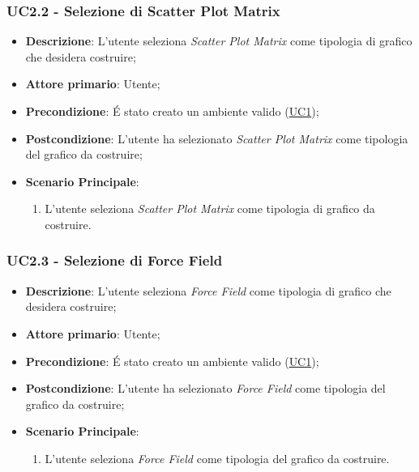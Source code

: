\subsubsection{UC2.2 - Selezione di Scatter Plot Matrix}
\label{ssub:uc2.2}
\begin{itemize}

	\item \textbf{Descrizione}: L’utente seleziona \emph{Scatter Plot Matrix} come tipologia di grafico che desidera 
	costruire;

    \item \textbf{Attore primario}: Utente;

	\item \textbf{Precondizione}:   É stato creato un ambiente valido (\hyperref[sub:uc1]{UC1});

	\item \textbf{Postcondizione}:  L'utente ha selezionato \emph{Scatter Plot Matrix} come tipologia del grafico da 
	costruire;

	\item \textbf{Scenario Principale}:
	\begin{enumerate}
		\item L'utente seleziona \emph{Scatter Plot Matrix} come tipologia di grafico da costruire.
	\end{enumerate}
\end{itemize}


\subsubsection{UC2.3 - Selezione di Force Field}
\label{ssub:uc2.3}
\begin{itemize}

	\item \textbf{Descrizione}: L’utente seleziona \emph{Force Field} come tipologia di grafico che desidera 
	costruire;

    \item \textbf{Attore primario}: Utente;

    \item \textbf{Precondizione}:   É stato creato un ambiente valido (\hyperref[sub:uc1]{UC1});

    \item \textbf{Postcondizione}:  L'utente ha selezionato \emph{Force Field} come tipologia del grafico da 
	costruire;
	
	\item \textbf{Scenario Principale}: 
	\begin{enumerate}
		\item L'utente seleziona \emph{Force Field} come tipologia del grafico da costruire.
	\end{enumerate}

\end{itemize}


